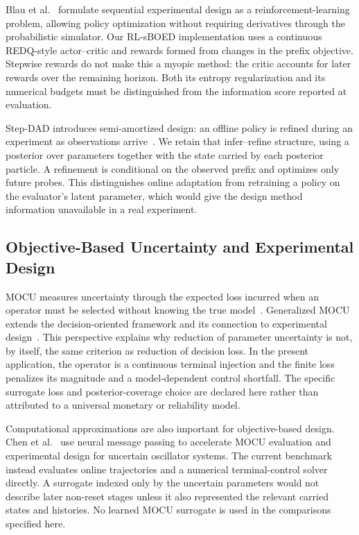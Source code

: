 \documentclass[journal]{IEEEtran}
\begin{document}
Blau et al.~\cite{blau2022rlsboed} formulate sequential experimental design as
a reinforcement-learning problem, allowing policy optimization without
requiring derivatives through the probabilistic simulator. Our RL-sBOED
implementation uses a continuous REDQ-style actor--critic and rewards formed
from changes in the prefix objective. Stepwise rewards do not make this a
myopic method: the critic accounts for later rewards over the remaining
horizon. Both its entropy regularization and its numerical budgets must be
distinguished from the information score reported at evaluation.

Step-DAD introduces semi-amortized design: an offline policy is refined during
an experiment as observations arrive~\cite{hedman2025stepdad}. We retain that
infer--refine structure, using a posterior over parameters together with the
state carried by each posterior particle. A refinement is conditional on the
observed prefix and optimizes only future probes. This distinguishes online
adaptation from retraining a policy on the evaluator's latent parameter, which
would give the design method information unavailable in a real experiment.

\subsection{Objective-Based Uncertainty and Experimental Design}
MOCU measures uncertainty through the expected loss incurred when an operator
must be selected without knowing the true model~\cite{yoon2013mocu}.
Generalized MOCU extends the decision-oriented framework and its connection
to experimental design~\cite{boluki2018generalized}. This perspective explains
why reduction of parameter uncertainty is not, by itself, the same criterion
as reduction of decision loss. In the present application, the operator is a
continuous terminal injection and the finite loss penalizes its magnitude
and a model-dependent control shortfall. The specific surrogate loss and
posterior-coverage choice are declared here rather than attributed to a
universal monetary or reliability model.

Computational approximations are also important for objective-based design.
Chen et al.~\cite{chen2023objectiveoed} use neural message passing to accelerate
MOCU evaluation and experimental design for uncertain oscillator systems.
The current benchmark instead evaluates online trajectories and a numerical
terminal-control solver directly. A surrogate indexed only by the uncertain
parameters would not describe later non-reset stages unless it also represented
the relevant carried states and histories. No learned MOCU surrogate is used
in the comparisons specified here.
\end{document}

